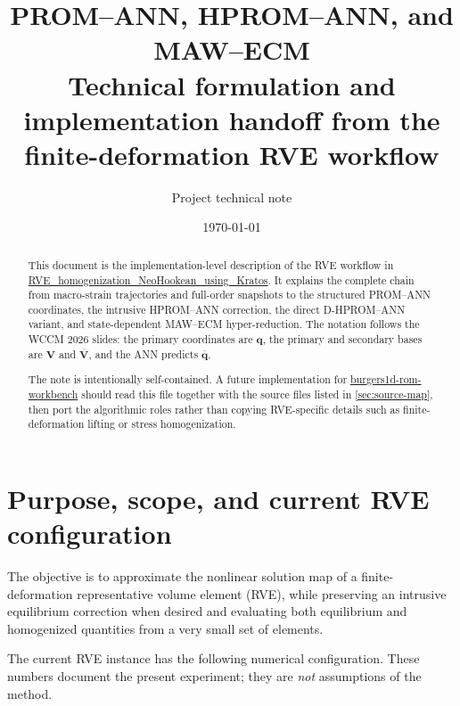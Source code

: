 \documentclass[11pt,a4paper]{article}
\title{\textbf{PROM--ANN, HPROM--ANN, and MAW--ECM}\\
\large Technical formulation and implementation handoff from the finite-deformation RVE workflow}
\author{Project technical note}
\date{\today}
\newcommand{\vect}[1]{\mathbf{#1}}
\newcommand{\mat}[1]{\mathbf{#1}}
\newcommand{\code}[1]{\url{#1}}
\begin{document}
\maketitle

\begin{abstract}
This document is the implementation-level description of the RVE workflow in
\url{RVE_homogenization_NeoHookean_using_Kratos}.  It explains the
complete chain from macro-strain trajectories and full-order snapshots to the
structured PROM--ANN coordinates, the intrusive HPROM--ANN correction, the
direct D-HPROM--ANN variant, and state-dependent MAW--ECM hyper-reduction.
The notation follows the WCCM 2026 slides: the primary coordinates are
\(\vect q\), the primary and secondary bases are \(\mat V\) and
\(\overline{\mat V}\), and the ANN predicts \(\overline{\vect q}\).

The note is intentionally self-contained.  A future implementation for
\code{burgers1d-rom-workbench} should read this file together with the source
files listed in \cref{sec:source-map}, then port the algorithmic roles rather
than copying RVE-specific details such as finite-deformation lifting or stress
homogenization.
\end{abstract}

\tableofcontents
\newpage

\section{Purpose, scope, and current RVE configuration}
\label{sec:scope}

The objective is to approximate the nonlinear solution map of a finite-
deformation representative volume element (RVE), while preserving an
intrusive equilibrium correction when desired and evaluating both equilibrium
and homogenized quantities from a very small set of elements.

The current RVE instance has the following numerical configuration.  These
numbers document the present experiment; they are \emph{not} assumptions of
the method.
\end{document}
